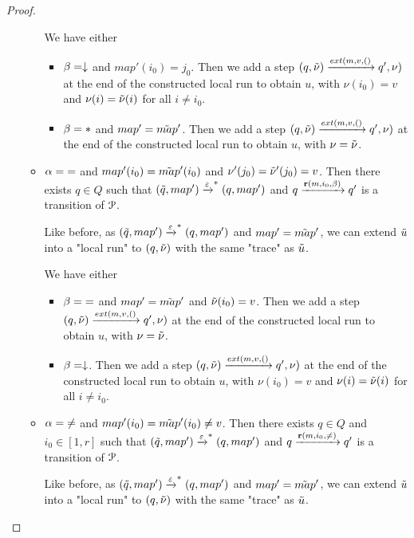 \begin{proof}
\begin{itemize}
\begin{itemize}
			We have either
			\begin{itemize}
				\item $\beta=\downarrow$ and $map'(i_0) = j_0$. Then we add a step $(q, \Tilde{\nu}) \extbr{m,v} (q', \nu)$ at the end of the constructed local run to obtain $u$, with $\nu(i_0)=v$ and $\nu(i) = \Tilde{\nu}(i)$ for all $i \neq i_0$.
				
				\item $\beta={*}$ and $map' = \Tilde{map}'$. Then we add a step $(q, \Tilde{\nu}) \extbr{m,v} (q', \nu)$ at the end of the constructed local run to obtain $u$, with $\nu = \Tilde{\nu}$.
			\end{itemize}
			
			\item $\alpha = {=}$ and $map'(i_0)=\Tilde{map}'(i_0)$ and $\nu'(j_0) = \Tilde{\nu}'(j_0) = v$. Then there exists $q \in Q$ such that $(\Tilde{q}, map') \xrightarrow{\varepsilon}^* (q, map')$ and $q \xrightarrow{\textbf{r}(m, i_0, \beta)} q'$ is a transition of $\mathcal{P}$.
			
			Like before, as $(\Tilde{q}, map') \xrightarrow{\varepsilon}^* (q, map')$ and $map'=\Tilde{map}'$, we can extend $\Tilde{u}$ into a "local run" to $(q, \Tilde{\nu})$ with the same  "trace" as $\Tilde{u}$.
			
			We have either
			\begin{itemize}
				\item $\beta={=}$ and $map' = \Tilde{map}'$ and $\Tilde{\nu}(i_0) = v$. Then we add a step $(q, \Tilde{\nu}) \extbr{m,v} (q', \nu)$ at the end of the constructed local run to obtain $u$, with $\nu = \Tilde{\nu}$.
				
				\item $\beta=\downarrow$. Then we add a step $(q, \Tilde{\nu}) \extbr{m,v} (q', \nu)$ at the end of the constructed local run to obtain $u$, with $\nu(i_0) = v$ and $\nu(i)=\Tilde{\nu}(i)$ for all $i \neq i_0$.
			\end{itemize}
			
			\item $\alpha = {\ne}$ and $map'(i_0)=\Tilde{map}'(i_0) \neq v$. Then there exists $q \in Q$ and $i_0 \in [1,r]$ such that $(\Tilde{q}, map') \xrightarrow{\varepsilon}^* (q, map')$ and $q \xrightarrow{\textbf{r}(m, i_0, {\ne})} q'$ is a transition of $\mathcal{P}$.
			
			Like before, as $(\Tilde{q}, map') \xrightarrow{\varepsilon}^* (q, map')$ and $map'=\Tilde{map}'$, we can extend $\Tilde{u}$ into a "local run" to $(q, \Tilde{\nu})$ with the same "trace" as $\Tilde{u}$.
			

\end{itemize}
\end{itemize}
\end{proof}
